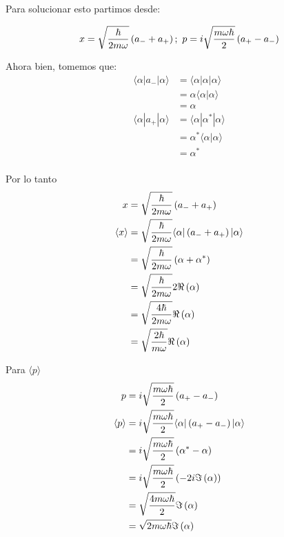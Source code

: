 \documentclass{report}
\begin{document}
\chapter{}

\chapter{}

\section{}

Para solucionar esto partimos desde:

\[
  x = \sqrt{\frac{\hbar}{2m\omega}} \left(a_{-} + a_{+}\right);\ p = i \sqrt{\frac{m\omega\hbar}{2}}\left(a_{+} - a_{-}\right)
\]

Ahora bien, tomemos que:
\begin{align*}
  \langle \alpha | a_{-} | \alpha \rangle &= \langle \alpha | \alpha | \alpha \rangle \\ &= \alpha \langle \alpha  | \alpha \rangle \\ &= \alpha\\
  \langle \alpha | a_{+} | \alpha \rangle &= \langle \alpha | \alpha^* | \alpha \rangle \\ &= \alpha^* \langle \alpha  | \alpha \rangle \\ &= \alpha^*\\
\end{align*}

Por lo tanto
\begin{align*}
  x &= \sqrt{\frac{\hbar}{2m\omega}} \left(a_{-} + a_{+}\right)\\
  \langle x \rangle &= \sqrt{\frac{\hbar}{2m\omega}} \langle \alpha |\left(a_{-} + a_{+}\right)| \alpha \rangle\\
  &= \sqrt{\frac{\hbar}{2m\omega}} \left(\alpha + \alpha^*\right)\\
  &= \sqrt{\frac{\hbar}{2m\omega}} 2\Re\left(\alpha\right)\\
  &= \sqrt{\frac{4\hbar}{2m\omega}} \Re\left(\alpha\right)\\
  &= \sqrt{\frac{2\hbar}{m\omega}} \Re\left(\alpha\right)
\end{align*}

Para $\langle p \rangle$
\begin{align*}
  p &= i \sqrt{\frac{m\omega\hbar}{2}}\left(a_{+} - a_{-}\right)\\
  \langle p \rangle &= i \sqrt{\frac{m\omega\hbar}{2}}\langle \alpha | \left(a_{+} - a_{-}\right) | \alpha \rangle\\
  &= i \sqrt{\frac{m\omega\hbar}{2}}\left(\alpha^* - \alpha\right) \\
  &= i \sqrt{\frac{m\omega\hbar}{2}}\left(-2i\Im\left(\alpha\right)\right)\\
  &= \sqrt{\frac{4 m\omega\hbar}{2}}\Im\left(\alpha\right)\\
  &= \sqrt{2 m\omega\hbar}\Im\left(\alpha\right)
\end{align*}
\end{document}
